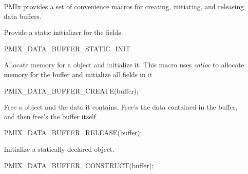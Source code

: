 \ac{PMIx} provides a set of convenience macros for creating, initiating, and releasing data buffers.


Provide a static initializer for the  fields.

\cspecificstart
\begin{codepar}
PMIX_DATA_BUFFER_STATIC_INIT
\end{codepar}
\cspecificend



Allocate memory for a  object and initialize it.
This macro uses \textit{calloc} to allocate memory for the buffer and initialize all fields in it

\cspecificstart
\begin{codepar}
PMIX_DATA_BUFFER_CREATE(buffer);
\end{codepar}
\cspecificend

\begin{arglist}
\end{arglist}


Free a  object and the data it contains.
Free's the data contained in the buffer, and then free's the buffer itself

\cspecificstart
\begin{codepar}
PMIX_DATA_BUFFER_RELEASE(buffer);
\end{codepar}
\cspecificend

\begin{arglist}
\end{arglist}



Initialize a statically declared  object.

\cspecificstart
\begin{codepar}
PMIX_DATA_BUFFER_CONSTRUCT(buffer);
\end{codepar}
\cspecificend

